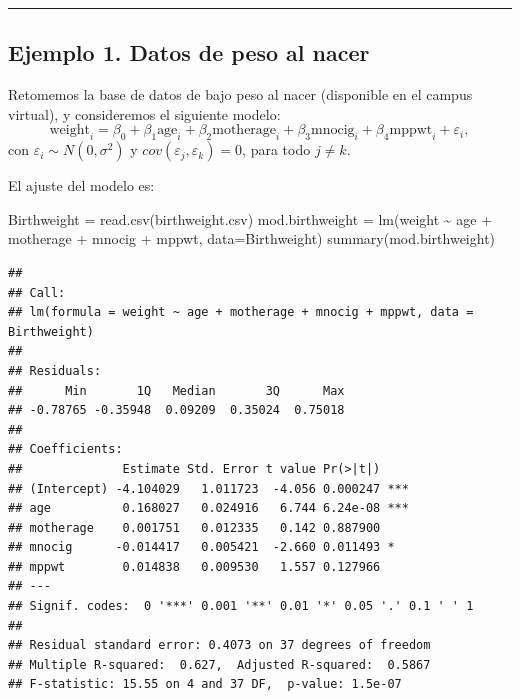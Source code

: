 \documentclass[
]{article}
\newenvironment{Shaded}{\begin{snugshade}}{\end{snugshade}}
\newcommand{\AttributeTok}[1]{\textcolor[rgb]{0.77,0.63,0.00}{#1}}
\newcommand{\FunctionTok}[1]{\textcolor[rgb]{0.00,0.00,0.00}{#1}}
\newcommand{\NormalTok}[1]{#1}
\newcommand{\OtherTok}[1]{\textcolor[rgb]{0.56,0.35,0.01}{#1}}
\newcommand{\SpecialCharTok}[1]{\textcolor[rgb]{0.00,0.00,0.00}{#1}}
\newcommand{\StringTok}[1]{\textcolor[rgb]{0.31,0.60,0.02}{#1}}
\begin{document}
\rule{\textwidth}{0.4pt}

\hypertarget{ejemplo-1.-datos-de-peso-al-nacer}{%
\subsection*{Ejemplo 1. Datos de peso al nacer}\label{ejemplo-1.-datos-de-peso-al-nacer}}

Retomemos la base de datos de bajo peso al nacer (disponible en el campus virtual), y consideremos el siguiente modelo:
\[
\mbox{weight}_{i} = \beta_{0} + \beta_{1}\mbox{age}_{i} + \beta_{2}\mbox{motherage}_{i} + \beta_{3}\mbox{mnocig}_{i} + \beta_{4}\mbox{mppwt}_{i} + \varepsilon_{i},
\]
con \(\varepsilon_{i} \sim N\left(0,\sigma^{2} \right)\) y \(cov(\varepsilon_{j},\varepsilon_{k})=0\), para todo \(j \neq k\).

El ajuste del modelo es:

\begin{Shaded}
\begin{Highlighting}[]
\NormalTok{Birthweight }\OtherTok{=} \FunctionTok{read.csv}\NormalTok{(}\StringTok{\textquotesingle{}birthweight.csv\textquotesingle{}}\NormalTok{)}
\NormalTok{mod.birthweight }\OtherTok{=} \FunctionTok{lm}\NormalTok{(weight }\SpecialCharTok{\textasciitilde{}}\NormalTok{ age }\SpecialCharTok{+}\NormalTok{ motherage }\SpecialCharTok{+}\NormalTok{ mnocig }\SpecialCharTok{+}\NormalTok{ mppwt, }\AttributeTok{data=}\NormalTok{Birthweight)}
\FunctionTok{summary}\NormalTok{(mod.birthweight)}
\end{Highlighting}
\end{Shaded}

\begin{verbatim}
## 
## Call:
## lm(formula = weight ~ age + motherage + mnocig + mppwt, data = Birthweight)
## 
## Residuals:
##      Min       1Q   Median       3Q      Max 
## -0.78765 -0.35948  0.09209  0.35024  0.75018 
## 
## Coefficients:
##              Estimate Std. Error t value Pr(>|t|)    
## (Intercept) -4.104029   1.011723  -4.056 0.000247 ***
## age          0.168027   0.024916   6.744 6.24e-08 ***
## motherage    0.001751   0.012335   0.142 0.887900    
## mnocig      -0.014417   0.005421  -2.660 0.011493 *  
## mppwt        0.014838   0.009530   1.557 0.127966    
## ---
## Signif. codes:  0 '***' 0.001 '**' 0.01 '*' 0.05 '.' 0.1 ' ' 1
## 
## Residual standard error: 0.4073 on 37 degrees of freedom
## Multiple R-squared:  0.627,  Adjusted R-squared:  0.5867 
## F-statistic: 15.55 on 4 and 37 DF,  p-value: 1.5e-07
\end{verbatim}
\end{document}
